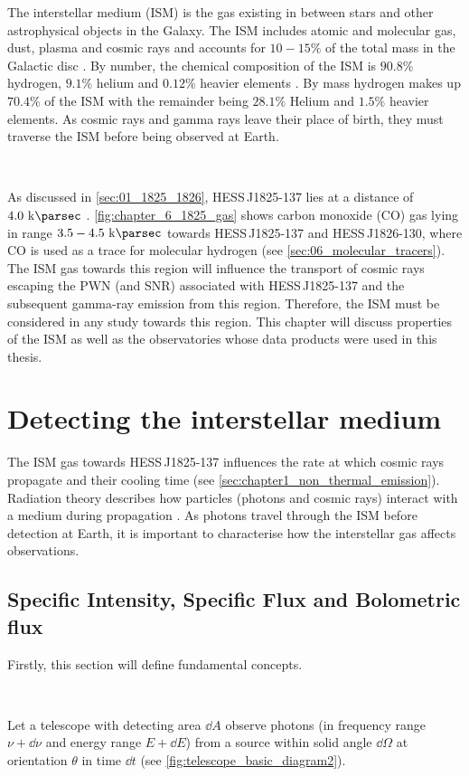 The interstellar medium (ISM) is the gas existing in between stars and other astrophysical objects in the Galaxy. The ISM includes atomic and molecular gas, dust, plasma and cosmic rays and accounts for $10-15\%$ of the total mass in the Galactic disc \citep{2001RvMP...73.1031F}. By number, the chemical composition of the ISM is $90.8\%$ hydrogen, $9.1\%$ helium and $0.12\%$ heavier elements \citep{2001RvMP...73.1031F}. By mass hydrogen makes up $70.4\%$ of the ISM with the remainder being $28.1\%$ Helium and $1.5\%$ heavier elements. As cosmic rays and gamma rays leave their place of birth, they must traverse the ISM before being observed at Earth.
\par~\par 
As discussed in \autoref{sec:01_1825_1826}, \mbox{HESS\,J1825-137} lies at a distance of $4.0~\kpc$  \citep{2006A&A...460..365A}. \autoref{fig:chapter_6_1825_gas} shows carbon monoxide (CO) gas lying in range $3.5-4.5~\kpc$ towards \mbox{HESS\,J1825-137} and \mbox{HESS\,J1826-130}, where CO is used as a trace for molecular hydrogen (see \autoref{sec:06_molecular_tracers}). The ISM gas towards this region will influence the transport of cosmic rays escaping the PWN (and SNR) associated with \mbox{HESS\,J1825-137} and the subsequent gamma-ray emission from this region. Therefore, the ISM must be considered in any study towards this region. This chapter will discuss properties of the ISM as well as the observatories whose data products were used in this thesis.
\newpage  %
\section{Detecting the interstellar medium}

The ISM gas towards \mbox{HESS\,J1825-137} influences the rate at which cosmic rays propagate and their cooling time (see \autoref{sec:chapter1_non_thermal_emission}). Radiation theory describes how particles (photons and cosmic rays) interact with a medium during propagation \citep{2011piim.book.....D}. As photons travel through the ISM before detection at Earth, it is important to characterise how the interstellar gas affects observations.

\subsection{Specific Intensity, Specific Flux and Bolometric flux}

Firstly, this section will define fundamental concepts.
\par~\par 
\noindent Let a telescope with detecting area $\dd{A}$ observe photons (in frequency range $\nu + \dd{\nu}$ and energy range $E+\dd{E}$) from a source within solid angle $\dd{\Omega}$ at orientation $\theta$ in time $\dd{t}$ (see \autoref{fig:telescope_basic_diagram2}).

